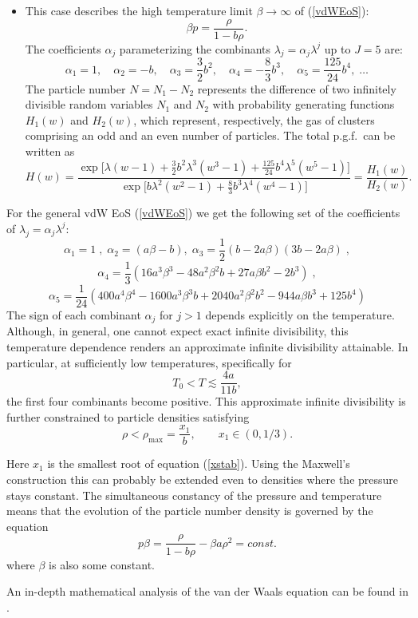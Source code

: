 \documentclass[a4paper,12pt]{amsart}
\theoremstyle{definition}
\theoremstyle{remark}
\begin{document}
\begin{enumerate}[label=(\roman*), leftmargin=*]
\begin{itemize}
    \item[\(a=0:\)] This case describes the high temperature limit $\beta \to \infty$ of  (\ref{vdWEoS}):
    \[
    \beta p = \frac{\rho}{1-b\rho}.
    \]
    The coefficients \(\alpha_j\) parameterizing the combinants \(\lambda_j = \alpha_j \lambda^j\) up to \(J=5\) are:
    \[
    \alpha_1 = 1,\quad
    \alpha_2 = -b,\quad
    \alpha_3 = \frac{3}{2} b^2,\quad
    \alpha_4 = -\frac{8}{3} b^3,\quad
    \alpha_5 = \frac{125}{24} b^4,\;\ldots
    \]
    The particle number \(N = N_1 - N_2\) represents the difference of two infinitely divisible random variables \(N_1\) and \(N_2\) with probability generating functions \(H_1(w)\) and \(H_2(w)\), which represent, respectively, the gas of clusters comprising an odd and an even number of particles. The total p.g.f.\ can be written as
    \[
    H(w)
    = \frac{\exp\!\Big[\lambda(w-1) + \frac{3}{2} b^2 \lambda^3 (w^3-1) + \frac{125}{24} b^4 \lambda^5 (w^5-1)\Big]}
           {\exp\!\Big[b\lambda^2 (w^2-1) + \frac{8}{3} b^3 \lambda^4 (w^4-1)\Big]}
    = \frac{H_1(w)}{H_2(w)}.
    \]
\end{itemize} 
For the general vdW EoS (\ref{vdWEoS}) we get the following set of the coefficients of $\lambda_j=\alpha_j \lambda^j$:
\[ \alpha_1=1\;,\;
\alpha_2=(a \beta-b ),\; \alpha_3=\frac{1}{2} (b-2 a \beta ) (3 b-2 a \beta )\;, 
\]
\[
\alpha_4=\frac{1}{3}\left(16 a^3 \beta ^3-48 a^2 \beta ^2 b+27 a \beta  b^2-2 b^3\right)\;,
\]
\[
\alpha_5=\frac{1}{24}\left(400 a^4 \beta ^4-1600 a^3 \beta ^3 b+2040 a^2 \beta ^2 b^2-944 a \beta  b^3+125 b^4\right)
\]
The sign of each combinant \(\alpha_j\) for \(j>1\) depends explicitly on the temperature. Although, in general, one cannot expect exact infinite divisibility, this temperature dependence renders an approximate infinite divisibility attainable. In particular, at sufficiently low temperatures, specifically for
\[
T_0 < T \lesssim \frac{4a}{11b},
\]
the first four combinants become positive. This approximate infinite divisibility is further constrained to particle densities satisfying
\[
\rho < \rho_{\max} = \frac{x_1}{b}, \qquad x_1 \in (0,1/3).
\]

Here $x_1$ is the smallest root of equation (\ref{xstab}). Using the Maxwell’s construction this can probably be extended even to densities where the pressure stays constant. The simultaneous constancy of the pressure and temperature means that the evolution of the particle number density is governed by the equation 
\[
p\beta =\frac{\rho }{1-b\rho} - \beta a \rho^2 =const.
\]
where $\beta$ is also some constant.
 
An in-depth mathematical analysis of the van der Waals equation can be found in \cite{Prodanov2022}.

\end{enumerate}

\newpage


\end{document}

